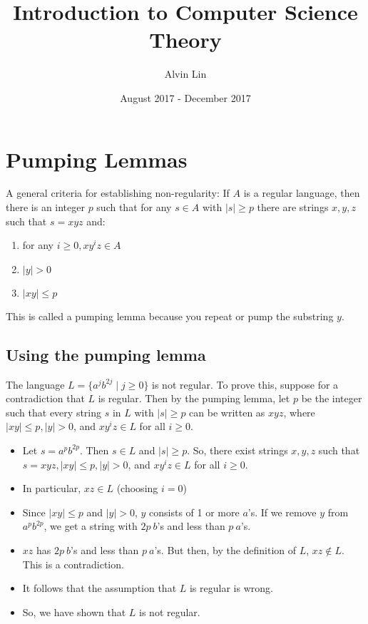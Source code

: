 \documentclass{math}
\title{Introduction to Computer Science Theory}
\author{Alvin Lin}
\date{August 2017 - December 2017}
\begin{document}
\maketitle

\section*{Pumping Lemmas}
A general criteria for establishing non-regularity: If \( A \) is a regular
language, then there is an integer \( p \) such that for any \( s\in A \) with
\( |s|\ge p \) there are strings \( x,y,z \) such that \( s = xyz \) and:
\begin{enumerate}
  \item for any \( i\ge0, xy^iz\in A \)
  \item \( |y| > 0 \)
  \item \( |xy|\le p \)
\end{enumerate}
This is called a pumping lemma because you repeat or pump the substring \( y \).

\subsection*{Using the pumping lemma}
The language \( L = \{a^jb^{2j}\mid j\ge 0\} \) is not regular. To prove this,
suppose for a contradiction that \( L \) is regular. Then by the pumping lemma,
let \( p \) be the integer such that every string \( s \) in \( L \) with
\( |s|\ge p \) can be written as \( xyz \), where \( |xy|\le p, |y| > 0 \), and
\( xy^iz\in L \) for all \( i\ge0 \).
\begin{itemize}
  \item Let \( s = a^pb^{2p} \). Then \( s\in L \) and \( |s|\ge p \). So, there
  exist strings \( x,y,z \) such that \( s = xyz, |xy|\le p, |y|>0 \), and
  \( xy^iz\in L \) for all \( i\ge0 \).
  \item In particular, \( xz\in L \) (choosing \( i = 0 \))
  \item Since \( |xy|\le p \) and \( |y| > 0 \), \( y \) consists of 1 or more
  \( a \)'s. If we remove \( y \) from \( a^pb^{2p} \), we get a string with
  \( 2p~b \)'s and less than \( p~a \)'s.
  \item \( xz \) has \( 2p~b \)'s and less than \( p~a \)'s. But then, by the
  definition of \( L \), \( xz\notin L \). This is a contradiction.
  \item It follows that the assumption that \( L \) is regular is wrong.
  \item So, we have shown that \( L \) is not regular.
\end{itemize}
\end{document}
